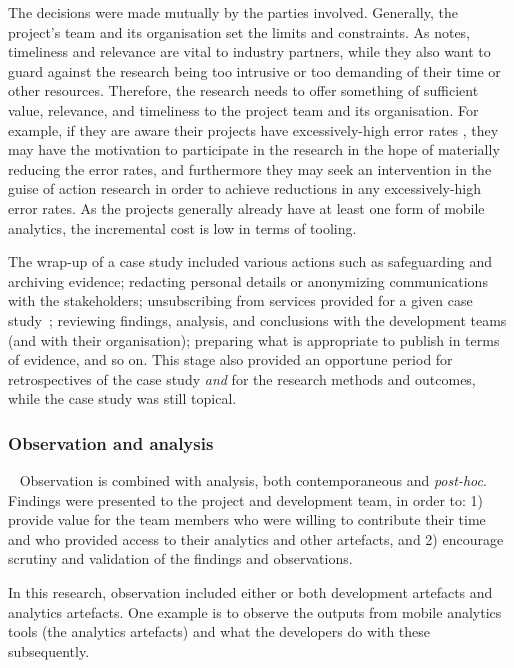 The decisions were made mutually by the parties involved. Generally, the project's team and its organisation set the limits and constraints. As  notes, timeliness and relevance are vital to industry partners, while they also want to guard against the research being too intrusive or too demanding of their time or other resources. Therefore, the research needs to offer something of sufficient value, relevance, and timeliness to the project team and its organisation. For example, if they are aware their projects have excessively-high error rates %
, they may have the motivation to participate in the research in the hope of materially reducing the error rates, and furthermore they may seek an intervention in the guise of action research in order to achieve reductions in any excessively-high error rates.  As the projects generally already have at least one form of mobile analytics, the incremental cost is low in terms of tooling.


The wrap-up of a case study included various actions such as safeguarding and archiving evidence; redacting personal details or anonymizing communications with the stakeholders; unsubscribing from services provided for a given case study~; reviewing findings, analysis, and conclusions with the development teams (and with their organisation); preparing what is appropriate to publish in terms of evidence, and so on. This stage also provided an opportune period for retrospectives of the case study \textit{and} for the research methods and outcomes, while the case study was still topical. 

\subsubsection{Observation and analysis}~\label{section-observation-research-method}
Observation is combined with analysis, both contemporaneous and \emph{post-hoc}.   Findings were presented to the project and development team, in order to: 1) provide value for the team members who were willing to contribute their time and who provided access to their analytics and other artefacts, and 2) encourage scrutiny and validation of the findings and observations.

In this research, observation included either or both development artefacts and analytics artefacts. One example is to observe the outputs from mobile analytics tools (the analytics artefacts) and what the developers do with these subsequently. 

